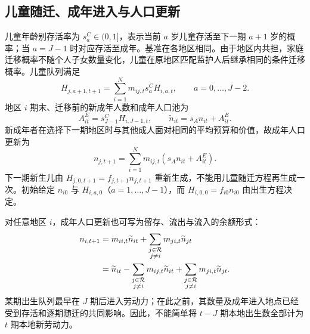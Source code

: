 \documentclass[UTF8,a4paper,zihao=-4,fontset=windows]{ctexart}
\numberwithin{equation}{section}
\begin{document}
\subsection{儿童随迁、成年进入与人口更新}
儿童年龄别存活率为 $s^C_a\in(0,1]$，表示当前 $a$ 岁儿童存活至下一期 $a+1$ 岁的概率；当 $a=J-1$ 时对应存活至成年。基准在各地区相同。由于地区内共担，家庭迁移概率不随个人子女数量变化，儿童在原地区匹配监护人后继承相同的条件迁移概率。儿童队列满足
\begin{equation}
  H_{j,a+1,t+1}=\sum_{i=1}^Nm_{ij,t}s^C_aH_{i,a,t},
  \qquad a=0,\ldots,J-2.
  \label{eq:child-transition}
\end{equation}
地区 $i$ 期末、迁移前的新成年人数和成年人口池为
\begin{equation}
  A^E_{it}=s^C_{J-1}H_{i,J-1,t},\qquad
  \widetilde n_{it}=s_An_{it}+A^E_{it}.
  \label{eq:entrants}
\end{equation}
新成年者在选择下一期地区时与其他成人面对相同的平均预算和价值，故成年人口更新为
\begin{equation}
  n_{j,t+1}=\sum_{i=1}^Nm_{ij,t}
                 (s_An_{it}+A^E_{it}).
  \label{eq:adult-transition}
\end{equation}
下一期新生儿由 $H_{j,0,t+1}=f_{j,t+1}n_{j,t+1}$ 重新生成，不能用儿童随迁方程再生成一次。初始给定 $n_{i0}$ 与 $H_{i,a,0}$（$a=1,\ldots,J-1$），而 $H_{i,0,0}=f_{i0}n_{i0}$ 由出生方程决定。

对任意地区 $i$，成年人口更新也可写为留存、流出与流入的余额形式：
\begin{align}
  n_{i,t+1}
    &=m_{ii,t}\widetilde n_{it}
       +\sum_{\substack{j\in\mathcal R\\j\ne i}}m_{ji,t}\widetilde n_{jt}
       \notag\\
    &=\widetilde n_{it}
       -\sum_{\substack{j\in\mathcal R\\j\ne i}}m_{ij,t}\widetilde n_{it}
       +\sum_{\substack{j\in\mathcal R\\j\ne i}}m_{ji,t}\widetilde n_{jt}.
  \label{eq:region-population-balance}
\end{align}
某期出生队列最早在 $J$ 期后进入劳动力；在此之前，其数量及成年进入地点已经受到存活和逐期随迁的共同影响。因此，不能简单将 $t-J$ 期本地出生数全部计为 $t$ 期本地新劳动力。
\end{document}
